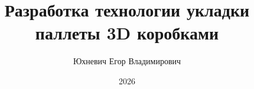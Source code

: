 \documentclass[utf8x,final]{G7-32} %
\title{Разработка технологии укладки паллеты 3D коробками}
\author{Юхневич Егор Владимирович}
\date{2026}
\begin{document}



%

\renewcommand{\student}{Юхневич Егор Владимирович}
\renewcommand{\group}{группы БПМИ 235, 3 курса}






\tableofcontents





\mainmatter %

        



\backmatter %


\end{document}

